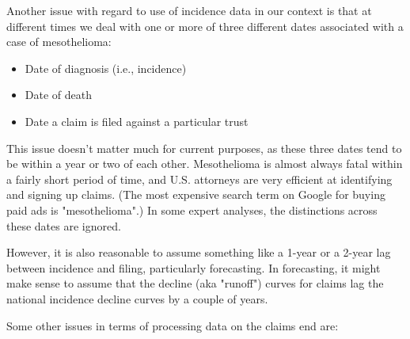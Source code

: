 \documentclass{article}\usepackage{graphicx, color}
\begin{document}
Another issue with regard to use of incidence data in our context is that at different times we deal with one or more of three different dates associated with a case of mesothelioma: 

\begin{itemize}
  \item Date of diagnosis (i.e., incidence)
  \item Date of death
  \item Date a claim is filed against a particular trust
\end{itemize}

This issue doesn't matter much for current purposes, as these three dates tend to be within a year or two of each other.  Mesothelioma is almost always fatal within a fairly short period of time, and U.S. attorneys are very efficient at identifying and signing up claims.  (The most expensive search term on Google for buying paid ads is "mesothelioma".)  In some expert analyses, the distinctions across these dates are ignored.

However, it is also reasonable to assume something like a 1-year or a 2-year lag between incidence and filing, particularly forecasting. In forecasting, it might make sense to assume that the decline (aka "runoff") curves for claims lag the national incidence decline curves by a couple of years.

Some other issues in terms of processing data on the claims end are:
\end{document}

